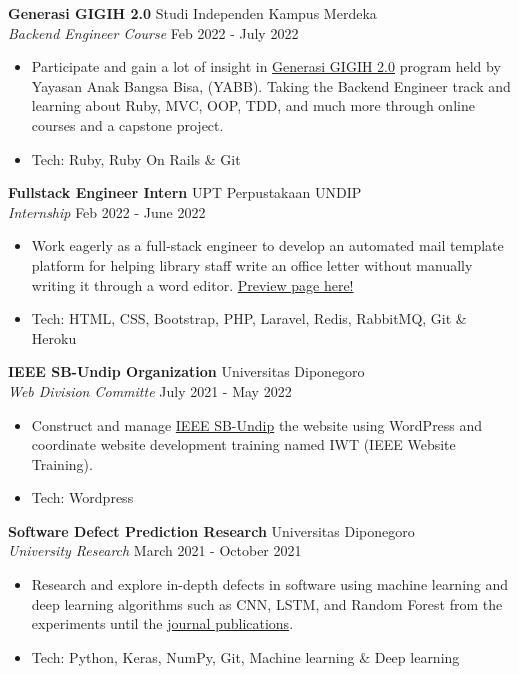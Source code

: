 \documentclass[a4paper]{article}
\begin{document}
\textbf{Generasi GIGIH 2.0} \hfill Studi Independen Kampus Merdeka \\
\textit{Backend Engineer Course} \hfill Feb 2022 - July 2022\\
\vspace{-1mm}
\begin{itemize} \itemsep 1pt
	\item Participate and gain a lot of insight in \href{https://www.anakbangsabisa.org/generasi-gigih/}{Generasi GIGIH 2.0} program held by Yayasan Anak Bangsa Bisa, (YABB). Taking the Backend Engineer track and learning about Ruby, MVC, OOP, TDD, and much more through online courses and a capstone project.
	\item Tech: Ruby, Ruby On Rails \& Git
\end{itemize}

\textbf{Fullstack Engineer Intern} \hfill UPT Perpustakaan UNDIP \\
\textit{Internship} \hfill Feb 2022 - June 2022\\
\vspace{-1mm}
\begin{itemize} \itemsep 1pt
	\item Work eagerly as a full-stack engineer to develop an automated mail template platform for helping library staff write an office letter without manually writing it through a word editor. \href{http://template-surat-testing.herokuapp.com/}{Preview page here!}
	\item Tech: HTML, CSS, Bootstrap, PHP, Laravel, Redis, RabbitMQ, Git \& Heroku
\end{itemize}

\textbf{IEEE SB-Undip Organization} \hfill Universitas Diponegoro\\
\textit{Web Division Committe} \hfill July 2021 - May 2022\\
\vspace{-1mm}
\begin{itemize} \itemsep 1pt
	\item Construct and manage \href{https://edu.ieee.org/id-undip/}{IEEE SB-Undip} the website using WordPress and coordinate website development training named IWT (IEEE Website Training).
	\item Tech: Wordpress
\end{itemize}

\textbf{Software Defect Prediction Research} \hfill Universitas Diponegoro\\
\textit{University Research} \hfill March 2021 - October 2021\\
\vspace{-1mm}
\begin{itemize} \itemsep 1pt
	\item Research and explore in-depth defects in software using machine learning and deep learning algorithms such as CNN, LSTM, and Random Forest from the experiments until the
	\href{https://github.com/mhnaufal/Software-Defect-Finale/blob/main/reports/PAPER-Software%20Defect%20Prediction.pdf}{journal publications}.
	\item Tech: Python, Keras, NumPy, Git, Machine learning \& Deep learning
\end{itemize}
\end{document}
